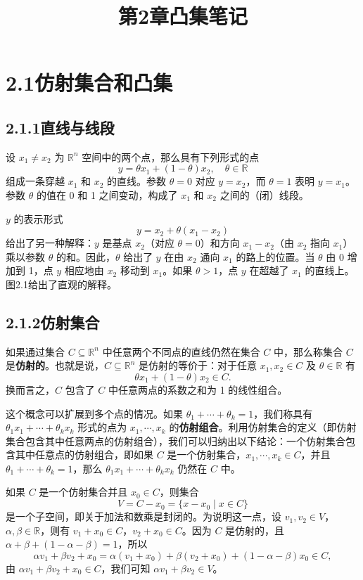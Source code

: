 \documentclass[UTF8,12pt,a4paper,fontset=fandol]{ctexart}
\title{第2章\quad 凸集笔记}
\author{}
\date{}
\begin{document}
\maketitle

\section*{2.1\quad 仿射集合和凸集}

\subsection*{2.1.1\quad 直线与线段}

设 $x_1\ne x_2$ 为 $\mathbb{R}^n$ 空间中的两个点，那么具有下列形式的点
\[
  y=\theta x_1+(1-\theta)x_2,\quad \theta\in\mathbb{R}
\]
组成一条穿越 $x_1$ 和 $x_2$ 的直线。参数 $\theta=0$ 对应 $y=x_2$，而 $\theta=1$ 表明 $y=x_1$。参数 $\theta$ 的值在 0 和 1 之间变动，构成了 $x_1$ 和 $x_2$ 之间的（闭）线段。

$y$ 的表示形式
\[
  y=x_2+\theta(x_1-x_2)
\]
给出了另一种解释：$y$ 是基点 $x_2$（对应 $\theta=0$）和方向 $x_1-x_2$（由 $x_2$ 指向 $x_1$）乘以参数 $\theta$ 的和。因此，$\theta$ 给出了 $y$ 在由 $x_2$ 通向 $x_1$ 的路上的位置。当 $\theta$ 由 0 增加到 1，点 $y$ 相应地由 $x_2$ 移动到 $x_1$。如果 $\theta>1$，点 $y$ 在超越了 $x_1$ 的直线上。图2.1给出了直观的解释。

\subsection*{2.1.2\quad 仿射集合}

如果通过集合 $C\subseteq\mathbb{R}^n$ 中任意两个不同点的直线仍然在集合 $C$ 中，那么称集合 $C$ 是\textbf{仿射的}。也就是说，$C\subseteq\mathbb{R}^n$ 是仿射的等价于：对于任意 $x_1,x_2\in C$ 及 $\theta\in\mathbb{R}$ 有
\[
  \theta x_1+(1-\theta)x_2\in C.
\]
换而言之，$C$ 包含了 $C$ 中任意两点的系数之和为 1 的线性组合。

这个概念可以扩展到多个点的情况。如果 $\theta_1+\cdots+\theta_k=1$，我们称具有 $\theta_1x_1+\cdots+\theta_kx_k$ 形式的点为 $x_1,\cdots,x_k$ 的\textbf{仿射组合}。利用仿射集合的定义（即仿射集合包含其中任意两点的仿射组合），我们可以归纳出以下结论：一个仿射集合包含其中任意点的仿射组合，即如果 $C$ 是一个仿射集合，$x_1,\cdots,x_k\in C$，并且 $\theta_1+\cdots+\theta_k=1$，那么 $\theta_1x_1+\cdots+\theta_kx_k$ 仍然在 $C$ 中。

如果 $C$ 是一个仿射集合并且 $x_0\in C$，则集合
\[
  V=C-x_0=\{x-x_0\mid x\in C\}
\]
是一个子空间，即关于加法和数乘是封闭的。为说明这一点，设 $v_1,v_2\in V$，$\alpha,\beta\in\mathbb{R}$，则有 $v_1+x_0\in C$，$v_2+x_0\in C$。因为 $C$ 是仿射的，且 $\alpha+\beta+(1-\alpha-\beta)=1$，所以
\[
  \alpha v_1+\beta v_2+x_0
  =\alpha(v_1+x_0)+\beta(v_2+x_0)+(1-\alpha-\beta)x_0\in C,
\]
由 $\alpha v_1+\beta v_2+x_0\in C$，我们可知 $\alpha v_1+\beta v_2\in V$。
\end{document}
